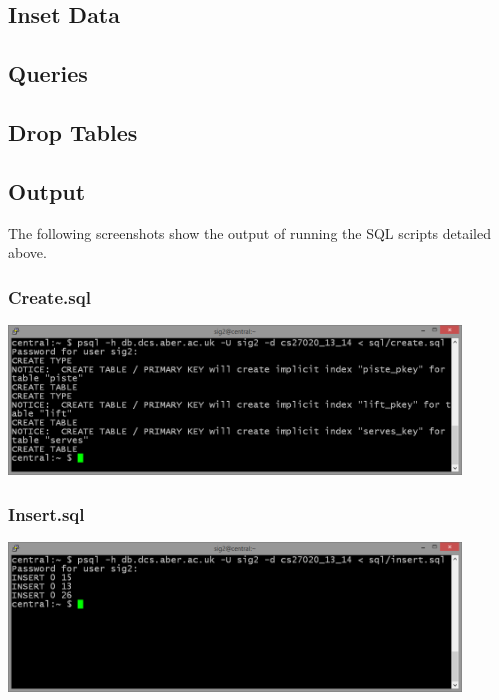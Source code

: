 \documentclass[titlepage ,12pt]{article}
\begin{document}
\newpage
\subsection{Inset Data}


\subsection{Queries}


\subsection{Drop Tables}

\newpage
\subsection{Output}

The following screenshots show the output of running the SQL scripts detailed above.
\subsubsection{Create.sql}
\FloatBarrier
\includegraphics[width=0.9\textwidth]{images/create}\\
\subsubsection{Insert.sql}
\FloatBarrier
\includegraphics[width=0.9\textwidth]{images/insert}\\
\end{document}
